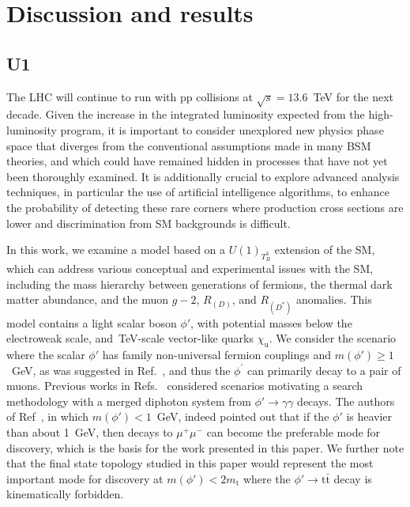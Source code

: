 \chapter{Discussion and results}

\section{U1}

The LHC will continue to run with pp collisions at $\sqrt{s} = 13.6$~\textrm{TeV} for the next decade. Given the increase in the integrated luminosity expected from the high-luminosity program, it is important to consider unexplored new physics phase space that diverges from the conventional assumptions made in many BSM theories, and which could have remained hidden in processes that have not yet been thoroughly examined. It is additionally crucial to explore advanced analysis techniques, in particular the use of artificial intelligence algorithms, to enhance the probability of detecting these rare corners where production cross sections are lower and discrimination from SM backgrounds is difficult. 

In this work, we examine a model based on a $U(1)_{T^3_R}$ extension of the SM, which can address various conceptual and experimental issues with the SM, including the mass hierarchy between generations of fermions, the thermal dark matter abundance, and the muon $g - 2$, $R_{(D)}$, and $R_{(D^*)}$ anomalies. This model contains a light scalar boson $\phi'$, with potential masses below the electroweak scale, and~\textrm{TeV}-scale vector-like quarks $\chi_\mathrm{u}$. We consider the scenario where the scalar $\phi'$ has family non-universal fermion couplings and $m(\phi') \ge 1$~\textrm{GeV}, as was suggested in Ref.~\parencite{Dutta2020}, and thus the $\phi^{\prime}$ can primarily decay to a pair of muons. Previous works in Refs.~\parencite{Dutta2023, Banerjee_2016} considered scenarios motivating a search methodology with a merged diphoton system from $\phi' \to \gamma\gamma$ decays. The authors of Ref~\parencite{Dutta2023}, in which $m(\phi') < 1$~\textrm{GeV},  indeed pointed out that if the $\phi'$ is heavier than about 1~\textrm{GeV}, then decays to $\mu^+ \mu^-$ can become the preferable mode for discovery, which is the basis for the work presented in this paper. We further note that the final state topology studied in this paper would represent the most important mode for discovery at $m(\phi') < 2 m_{\mathrm{t}}$ where the $\phi' \to \mathrm{t\bar{t}}$ decay is kinematically forbidden. 

